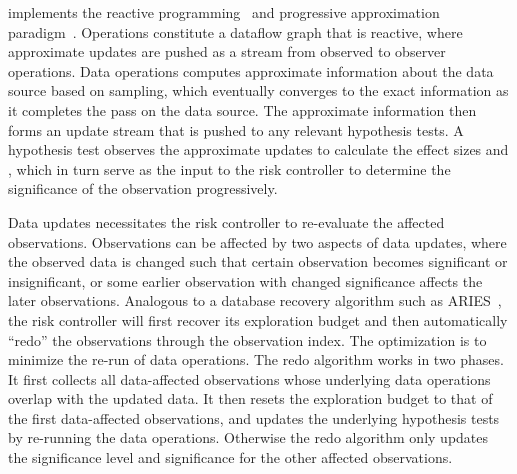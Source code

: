 \system{} implements the reactive programming~\cite{wan2000functional} and progressive approximation paradigm~\cite{vizdom, zgraggen2016progressive}. Operations constitute a dataflow graph that is reactive, where approximate updates are pushed as a stream from observed to observer operations. Data operations computes approximate information about the data source based on sampling, which eventually converges to the exact information as it completes the pass on the data source. The approximate information then forms an update stream that is pushed to any relevant hypothesis tests. A hypothesis test observes the approximate updates to calculate the effect sizes and \pvals, which in turn serve as the input to the risk controller to determine the significance of the observation progressively. 

Data updates necessitates the risk controller to re-evaluate the affected observations. Observations can be affected by two aspects of data updates, where the observed data is changed such that certain observation becomes significant or insignificant, or some earlier observation with changed significance affects the later observations.  Analogous to a database recovery algorithm such as ARIES~\cite{mohan1992aries}, the risk controller will first recover its exploration budget and then automatically ``redo'' the observations through the observation index.  The optimization is to minimize the re-run of data operations.  The redo algorithm works in two phases.  It first collects all data-affected observations whose underlying data operations overlap with the updated data.  It then resets the exploration budget to that of the first data-affected observations, and updates the underlying hypothesis tests by re-running the data operations.  Otherwise the redo algorithm only updates the significance level and significance for the other affected observations.